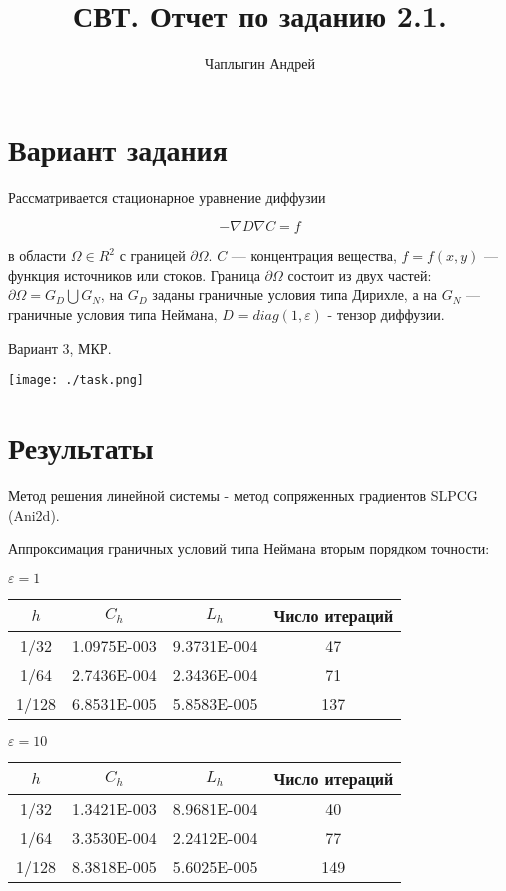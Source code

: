 \documentclass[12pt]{article}
\title{СВТ. Отчет по заданию 2.1.}
\author{Чаплыгин Андрей}
\date{}
\begin{document}
\maketitle

\section{Вариант задания}

Рассматривается стационарное уравнение диффузии

$$ -\nabla D \nabla C = f $$

в области $\Omega \in R^2$ с границей $\partial \Omega$. $C$ — концентрация вещества, $f = f(x, y)$
— функция источников или стоков. Граница $\partial \Omega$ состоит из
двух частей: $\partial \Omega = G_D \bigcup G_N$, на $G_D$ заданы граничные условия типа
Дирихле, а на $G_N$ — граничные условия типа Неймана, $D = diag(1, \varepsilon)$ - тензор
диффузии.

\bigskip
Вариант 3, МКР.


\texttt{[image: ./task.png]}


\section{Результаты}

Метод решения линейной системы - метод сопряженных градиентов SLPCG (Ani2d).

Аппроксимация граничных условий типа Неймана вторым порядком точности:

$\varepsilon = 1 $
\begin{center}
    \begin{tabular}{c|c|c|c}
      \hline
      $h$ & $C_h$ &  $L_h$ &  Число итераций \\
      \hline
      1/32 & 1.0975E-003 & 9.3731E-004 & 47 \\ 
      \hline
      1/64 & 2.7436E-004 & 2.3436E-004 & 71 \\ 
      \hline
	  1/128 &  6.8531E-005 & 5.8583E-005 & 137 \\
	  \hline 
    \end{tabular}
\end{center}

$\varepsilon = 10 $
\begin{center}
    \begin{tabular}{c|c|c|c}
      \hline
      $h$ & $C_h$ &  $L_h$ &  Число итераций \\
      \hline
      1/32 &   1.3421E-003  & 8.9681E-004 & 40 \\ 
      \hline
      1/64 &   3.3530E-004   & 2.2412E-004 & 77 \\ 
      \hline
	  1/128 &  8.3818E-005  & 5.6025E-005 & 149 \\ 
	  \hline 
    \end{tabular}
\end{center}
\end{document}
